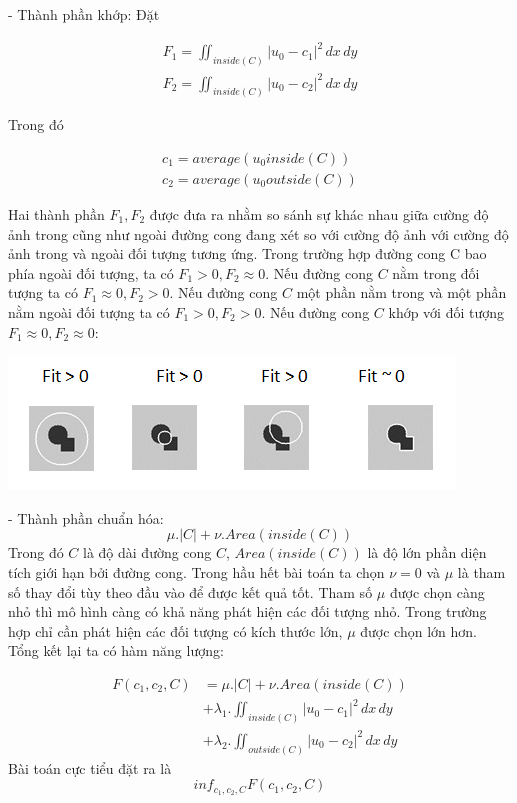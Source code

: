 \documentclass[12pt, oneside, a4]{book}
\begin{document}
- Thành phần khớp: Đặt

\begin{center}
\begin{align*}
F_1=\iint_{inside(C)} |u_0-c_1|^2 \,dx\,dy\\
F_2=\iint_{inside(C)} |u_0-c_2|^2 \,dx\,dy
\end{align*}
\end{center}
Trong đó
\begin{center}
\begin{align*}
c_1=average(u_0 inside(C))\\
c_2=average(u_0 outside(C))
\end{align*}
\end{center} 
Hai thành phần $F_1, F_2$ được đưa ra nhằm so sánh sự khác nhau giữa cường độ ảnh trong cũng như ngoài đường cong đang xét so với cường độ ảnh với cường độ ảnh trong và ngoài đối tượng tương ứng. Trong trường hợp đường cong C bao phía ngoài đối tượng, ta có $F_1>0, F_2\approx 0$. Nếu đường cong $C$ nằm trong đối tượng ta có $F_1 \approx0, F_2> 0$. Nếu đường cong $C$ một phần nằm trong và một phần nằm ngoài đối tượng ta có $F_1>0, F_2> 0$. Nếu đường cong $C$ khớp với đối tượng $F_1 \approx 0, F_2\approx 0$:
\begin{center}
\includegraphics[scale=1]{figure/fitting.png}
\end{center}
- Thành phần chuẩn hóa:
\begin{equation}
\mu .|C|+\nu .Area(inside(C))
\end{equation}
Trong đó $C$ là độ dài đường cong $C$, $Area(inside(C))$ là độ lớn phần diện tích giới hạn bởi đường cong. Trong hầu hết bài toán ta chọn $\nu=0$ và $\mu$ là tham số thay đổi tùy theo đầu vào để được kết quả tốt. Tham số $\mu $ được chọn càng nhỏ thì mô hình càng có khả năng phát hiện các đối tượng nhỏ. Trong trường hợp chỉ cần phát hiện các đối tượng có kích thước lớn, $\mu$ được chọn lớn hơn.\\

Tổng kết lại ta có hàm năng lượng: 

\begin{equation*}
\begin{split}
F(c_1, c_2, C)&=\mu .|C|+\nu .Area(inside(C)) \\ 
&+\lambda_1 .\iint_{inside(C)} |u_0-c_1|^2 \,dx\,dy\\
&+\lambda_2 .\iint_{outside(C)} |u_0-c_2|^2 \,dx\,dy
\end{split}
\end{equation*}
Bài toán cực tiểu đặt ra là
\begin{equation}
inf_{c_1,c_2,C} F(c_1, c_2, C)
\end{equation}
 
\end{document}

